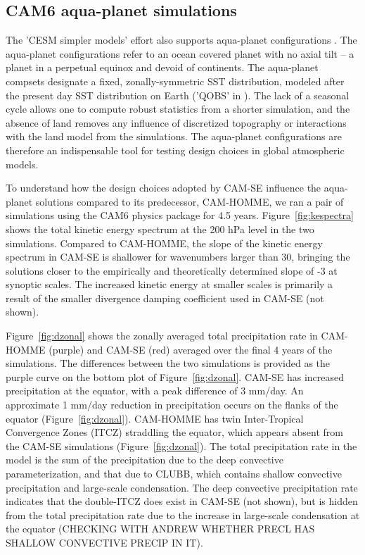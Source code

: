 \subsection{CAM6 aqua-planet simulations}
The 'CESM simpler models' effort also supports aqua-planet configurations \citep{MWO2016JAMES}. The aqua-planet configurations \citep{NH2000ASL} refer to an ocean covered planet with no axial tilt -- a planet in a perpetual equinox and devoid of continents. The aqua-planet compsets designate a fixed, zonally-symmetric SST distribution, modeled after the present day SST distribution on Earth ('QOBS' in \cite{NH2000ASL}). The lack of a seasonal cycle allows one to compute robust statistics from a shorter simulation, and the absence of land removes any influence of discretized topography or interactions with the land model from the simulations. The aqua-planet configurations are therefore an indispensable tool for testing design choices in global atmospheric models.

To understand how the design choices adopted by CAM-SE influence the aqua-planet solutions compared to its predecessor, CAM-HOMME, we ran a pair of simulations using the CAM6 physics package \cite{} for 4.5 years. Figure~\ref{fig:kespectra} shows the total kinetic energy spectrum at the 200 hPa level in the two simulations. Compared to CAM-HOMME, the slope of the kinetic energy spectrum in CAM-SE is shallower for wavenumbers larger than 30, bringing the solutions closer to the empirically \citep{NG1985JAS} and theoretically \citep{C1971JAS} determined slope of -3 at synoptic scales. The increased kinetic energy at smaller scales is primarily a result of the smaller divergence damping coefficient used in CAM-SE (not shown).

 Figure~\ref{fig:dzonal} shows the zonally averaged total precipitation rate in CAM-HOMME (purple) and CAM-SE (red) averaged over the final 4 years of the simulations. The differences between the two simulations is provided as the purple curve on the bottom plot of Figure~\ref{fig:dzonal}. CAM-SE has increased precipitation at the equator, with a peak difference of 3 mm/day. An approximate 1 mm/day reduction in precipitation occurs on the flanks of the equator (Figure~\ref{fig:dzonal}). CAM-HOMME has twin Inter-Tropical Convergence Zones (ITCZ) straddling the equator, which appears absent from the CAM-SE simulations (Figure~\ref{fig:dzonal}). The total precipitation rate in the model is the sum of the precipitation due to the deep convective parameterization, and that due to CLUBB, which contains shallow convective precipitation and large-scale condensation. The deep convective precipitation rate indicates that the double-ITCZ does exist in CAM-SE (not shown), but is hidden from the total precipitation rate due to the increase in large-scale condensation at the equator (CHECKING WITH ANDREW WHETHER PRECL HAS SHALLOW CONVECTIVE PRECIP IN IT).

